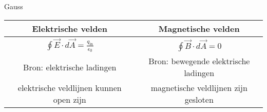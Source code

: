 \begin{vrg}[Gauss]{Gauss}
    \vspace{-0.3cm}
    \def\arraystretch{2}
    \hspace{1.5cm}
    \begin{tabular}{c|c}
        Elektrische velden & Magnetische velden \\ \hline
        $\oint \Vec{E} \cdot d\Vec{A} = \frac{q_{\text{in}}}{\epsilon_0}$ &  $\oint \Vec{B} \cdot d\Vec{A} = 0$ \\
        Bron: elektrische ladingen & Bron: bewegende elektrische ladingen \\
        elektrische veldlijnen kunnen open zijn & magnetische veldlijnen zijn gesloten \\
    \end{tabular}
\end{vrg}

\newpage

